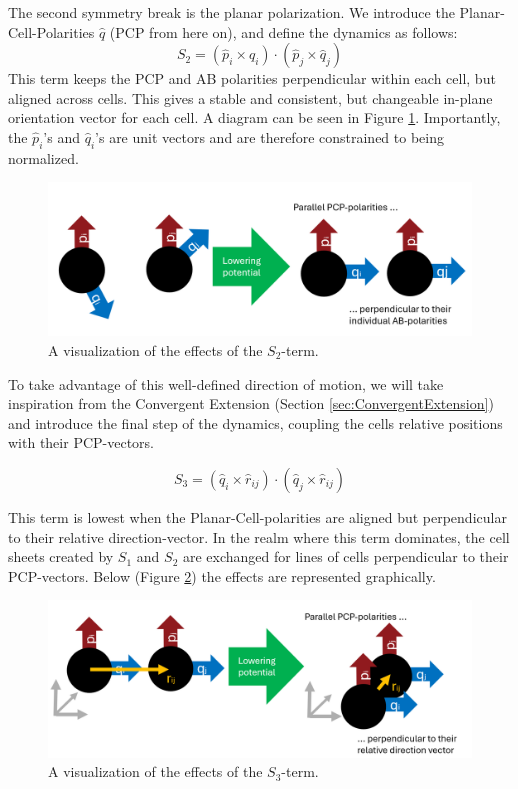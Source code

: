 The second symmetry break is the planar polarization. We introduce the Planar-Cell-Polarities $\hat{q}$ (PCP from here on), and define the dynamics as follows:
\begin{equation*}
    S_2=\left(\hat{p}_i \times \hat{q}_{i}\right) \cdot\left(\hat{p}_j \times \hat{q}_{j}\right)
\end{equation*}
This term keeps the PCP and AB polarities perpendicular within each cell, but aligned across cells. This gives a stable and consistent, but changeable in-plane orientation vector for each cell. A diagram can be seen in Figure \ref{fig:explain-S2}. Importantly, the $\hat{p}_i$'s and $\hat{q}_i$'s are unit vectors and are therefore constrained to being normalized.\\
\begin{figure}[H]
    \centering
    \includegraphics[width=1\linewidth]{chapters//Theory//figures/explainS2.png}
    \caption{A visualization of the effects of the $S_2$-term.}
    \label{fig:explain-S2}
\end{figure}
To take advantage of this well-defined direction of motion, we will take inspiration from the Convergent Extension (Section \ref{sec:ConvergentExtension}) and introduce the final step of the dynamics, coupling the cells relative positions with their PCP-vectors.

\begin{equation*}
    S_3=\left(\hat{q}_i \times \hat{r}_{i j}\right) \cdot\left(\hat{q}_j \times \hat{r}_{i j}\right)
\end{equation*}

This term is lowest when the Planar-Cell-polarities are aligned but perpendicular to their relative direction-vector. In the realm where this term dominates, the cell sheets created by $S_1$ and $S_2$ are exchanged for lines of cells perpendicular to their PCP-vectors.  Below (Figure \ref{fig:expl-s3}) the effects are represented graphically.
\begin{figure}[H]
    \centering
    \includegraphics[width=1\linewidth]{chapters//Theory//figures/explainS3.png}
    \caption{A visualization of the effects of the $S_3$-term.}
    
    \label{fig:expl-s3}
\end{figure}

